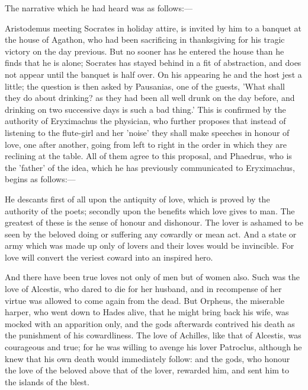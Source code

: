 \documentclass[11pt,letter]{article}
\begin{document}
\par  The narrative which he had heard was as follows:—

\par  Aristodemus meeting Socrates in holiday attire, is invited by him to a banquet at the house of Agathon, who had been sacrificing in thanksgiving for his tragic victory on the day previous. But no sooner has he entered the house than he finds that he is alone; Socrates has stayed behind in a fit of abstraction, and does not appear until the banquet is half over. On his appearing he and the host jest a little; the question is then asked by Pausanias, one of the guests, 'What shall they do about drinking? as they had been all well drunk on the day before, and drinking on two successive days is such a bad thing.' This is confirmed by the authority of Eryximachus the physician, who further proposes that instead of listening to the flute-girl and her 'noise' they shall make speeches in honour of love, one after another, going from left to right in the order in which they are reclining at the table. All of them agree to this proposal, and Phaedrus, who is the 'father' of the idea, which he has previously communicated to Eryximachus, begins as follows:—

\par  He descants first of all upon the antiquity of love, which is proved by the authority of the poets; secondly upon the benefits which love gives to man. The greatest of these is the sense of honour and dishonour. The lover is ashamed to be seen by the beloved doing or suffering any cowardly or mean act. And a state or army which was made up only of lovers and their loves would be invincible. For love will convert the veriest coward into an inspired hero.

\par  And there have been true loves not only of men but of women also. Such was the love of Alcestis, who dared to die for her husband, and in recompense of her virtue was allowed to come again from the dead. But Orpheus, the miserable harper, who went down to Hades alive, that he might bring back his wife, was mocked with an apparition only, and the gods afterwards contrived his death as the punishment of his cowardliness. The love of Achilles, like that of Alcestis, was courageous and true; for he was willing to avenge his lover Patroclus, although he knew that his own death would immediately follow: and the gods, who honour the love of the beloved above that of the lover, rewarded him, and sent him to the islands of the blest.
\end{document}
